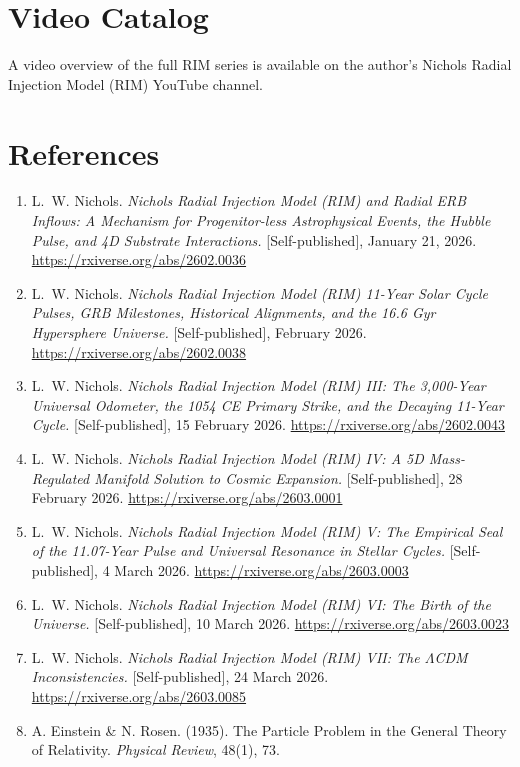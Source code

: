 \documentclass[11pt,a4paper]{article}
\begin{document}
\section{Video Catalog}

A video overview of the full RIM series is available on the author’s Nichols Radial Injection Model (RIM) YouTube channel.

\section*{References}

\begin{enumerate}
    \item L.~W. Nichols. \textit{Nichols Radial Injection Model (RIM) and Radial ERB Inflows: A Mechanism for Progenitor-less Astrophysical Events, the Hubble Pulse, and 4D Substrate Interactions.} [Self-published], January 21, 2026. \url{https://rxiverse.org/abs/2602.0036}
    \item L.~W. Nichols. \textit{Nichols Radial Injection Model (RIM) 11-Year Solar Cycle Pulses, GRB Milestones, Historical Alignments, and the 16.6 Gyr Hypersphere Universe.} [Self-published], February 2026. \url{https://rxiverse.org/abs/2602.0038}
    \item L.~W. Nichols. \textit{Nichols Radial Injection Model (RIM) III: The 3,000-Year Universal Odometer, the 1054 CE Primary Strike, and the Decaying 11-Year Cycle.} [Self-published], 15 February 2026. \url{https://rxiverse.org/abs/2602.0043}
    \item L.~W. Nichols. \textit{Nichols Radial Injection Model (RIM) IV: A 5D Mass-Regulated Manifold Solution to Cosmic Expansion.} [Self-published], 28 February 2026. \url{https://rxiverse.org/abs/2603.0001}
    \item L.~W. Nichols. \textit{Nichols Radial Injection Model (RIM) V: The Empirical Seal of the 11.07-Year Pulse and Universal Resonance in Stellar Cycles.} [Self-published], 4 March 2026. \url{https://rxiverse.org/abs/2603.0003}
    \item L.~W. Nichols. \textit{Nichols Radial Injection Model (RIM) VI: The Birth of the Universe.} [Self-published], 10 March 2026. \url{https://rxiverse.org/abs/2603.0023}
    \item L.~W. Nichols. \textit{Nichols Radial Injection Model (RIM) VII: The $\Lambda$CDM Inconsistencies.} [Self-published], 24 March 2026. \url{https://rxiverse.org/abs/2603.0085}
    \item A. Einstein \& N. Rosen. (1935). The Particle Problem in the General Theory of Relativity. \textit{Physical Review}, 48(1), 73.
\end{enumerate}
\end{document}
